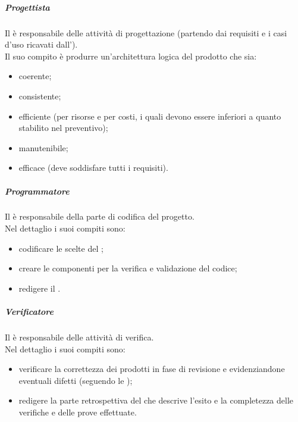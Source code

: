 \subparagraph{Progettista}
Il \progetProg{} è responsabile delle attività di progettazione (partendo dai requisiti e i casi d'uso ricavati dall'\analProg{}).\\Il suo compito è produrre un'architettura logica del prodotto che sia:
\begin{itemize}
\item coerente;
\item consistente;
\item efficiente (per risorse e per costi, i quali devono essere inferiori a quanto stabilito nel preventivo);
\item manutenibile;
\item efficace (deve soddisfare tutti i requisiti).
\end{itemize}

\subparagraph{Programmatore} 
Il \programProg{} è responsabile della parte di codifica del progetto.\\Nel dettaglio i suoi compiti sono:
\begin{itemize}
\item codificare le scelte del \progetProg{};
\item creare le componenti per la verifica e validazione del codice;
\item redigere il \MU{}.
\end{itemize}

\subparagraph{Verificatore}
Il \verifProg{} è responsabile delle attività di verifica.\\Nel dettaglio i suoi compiti sono:
\begin{itemize}
\item verificare la correttezza dei prodotti in fase di revisione e evidenziandone eventuali difetti (seguendo le \NdP{}); 
\item redigere la parte retrospettiva del \PdQ{} che descrive l'esito e la completezza delle verifiche e delle prove effettuate.
\end{itemize}